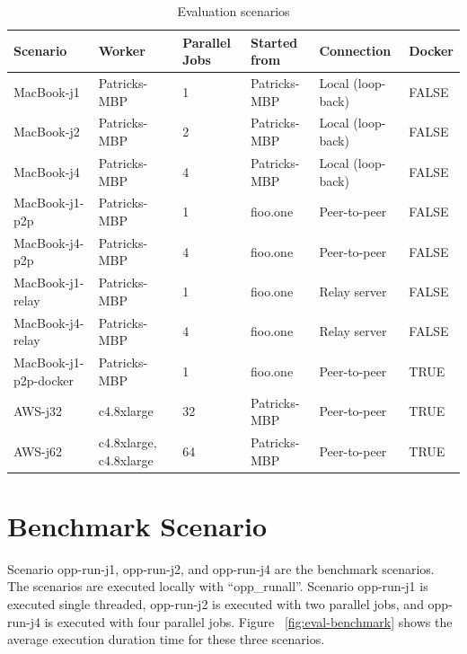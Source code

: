 \begin{table}[h]
\begin{center}
    \begin{tabular}{ | m{8em} | m{5em}| m{4em} | m{6em} | m{6em}| m{3em} | }
      \hline
      Scenario & Worker & Parallel Jobs & Started from & Connection & Docker \\ 
      \hline
      MacBook-j1 & Patricks-MBP & 1 & Patricks-MBP & Local (loop-back) & FALSE \\
      \hline
      MacBook-j2 & Patricks-MBP & 2 & Patricks-MBP & Local (loop-back) & FALSE \\
      \hline
      MacBook-j4 & Patricks-MBP & 4 & Patricks-MBP & Local (loop-back) & FALSE \\
      \hline
      MacBook-j1-p2p & Patricks-MBP & 1 & fioo.one & Peer-to-peer & FALSE \\
      \hline
      MacBook-j4-p2p & Patricks-MBP & 4 & fioo.one & Peer-to-peer & FALSE \\
      \hline
      MacBook-j1-relay & Patricks-MBP & 1 & fioo.one & Relay server & FALSE \\
      \hline
      MacBook-j4-relay & Patricks-MBP & 4 & fioo.one & Relay server & FALSE \\
      \hline
      MacBook-j1-p2p-docker & Patricks-MBP & 1 & fioo.one & Peer-to-peer & TRUE \\
      \hline
      AWS-j32 & c4.8xlarge & 32 & Patricks-MBP & Peer-to-peer & TRUE \\
      \hline
      AWS-j62 & c4.8xlarge, c4.8xlarge & 64 & Patricks-MBP & Peer-to-peer & TRUE \\
      \hline
    \end{tabular}
    \caption{\label{tab:scenarios} Evaluation scenarios}
\end{center}
\end{table}

\section{Benchmark Scenario}

Scenario opp-run-j1, opp-run-j2, and opp-run-j4 are the benchmark scenarios. The scenarios are executed locally with “opp\_runall”. Scenario opp-run-j1 is executed single threaded, opp-run-j2 is executed with two parallel jobs, and opp-run-j4 is executed with four parallel jobs. Figure ~\ref{fig:eval-benchmark} shows the average execution duration time for these three scenarios.

